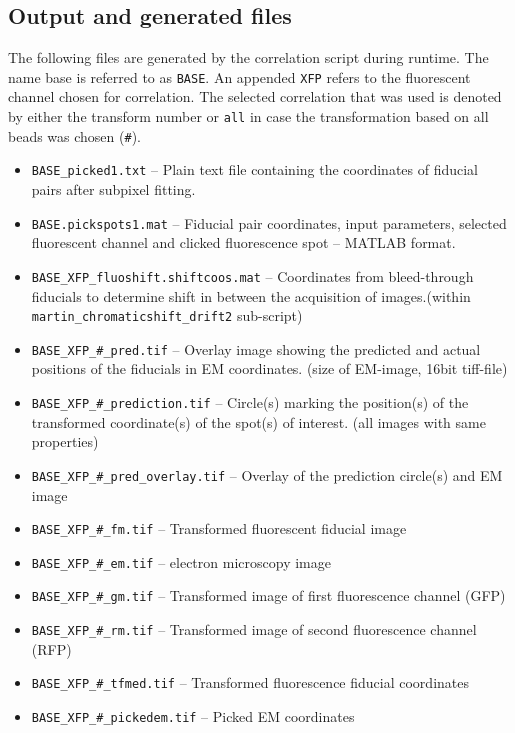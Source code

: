 \documentclass[10pt,a4paper,onepage,DIV12]{scrartcl}
\begin{document}
\subsection{Output and generated files}
\label{sec:lm_output}
The following files are generated by the correlation script during runtime. The name base is referred to as \texttt{BASE}. An appended \texttt{XFP} refers to the fluorescent channel chosen for correlation. The selected correlation that was used is denoted by either the transform number or \texttt{all} in case the transformation based on all beads was chosen (\texttt{\#}). 
\begin{itemize}
 \item \texttt{BASE\_picked1.txt} -- Plain text file containing the coordinates of fiducial pairs after subpixel fitting. 

\item \texttt{BASE.pickspots1.mat} -- Fiducial pair coordinates, input parameters, selected fluorescent channel and clicked fluorescence spot -- MATLAB format.

 \item \texttt{BASE\_XFP\_fluoshift.shiftcoos.mat} -- Coordinates from bleed-through fiducials to determine shift in between the acquisition of images.(within \texttt{martin\_chromaticshift\_drift2} sub-script)



\item \texttt{BASE\_XFP\_\#\_pred.tif} -- Overlay image showing the predicted and actual positions of the fiducials in EM coordinates. (size of EM-image, 16bit tiff-file)
\item \texttt{BASE\_XFP\_\#\_prediction.tif} -- Circle(s) marking the position(s) of the transformed coordinate(s) of the spot(s) of interest. (all images with same properties)
\item \texttt{BASE\_XFP\_\#\_pred\_overlay.tif} -- Overlay of the prediction circle(s) and EM image
\item \texttt{BASE\_XFP\_\#\_fm.tif} -- Transformed fluorescent fiducial image 
\item \texttt{BASE\_XFP\_\#\_em.tif} -- electron microscopy image 
\item \texttt{BASE\_XFP\_\#\_gm.tif} -- Transformed image of first fluorescence channel (GFP)
\item \texttt{BASE\_XFP\_\#\_rm.tif} -- Transformed image of second fluorescence channel (RFP)
\item \texttt{BASE\_XFP\_\#\_tfmed.tif} -- Transformed fluorescence fiducial coordinates
\item \texttt{BASE\_XFP\_\#\_pickedem.tif} -- Picked EM coordinates


\end{itemize}
\end{document}
